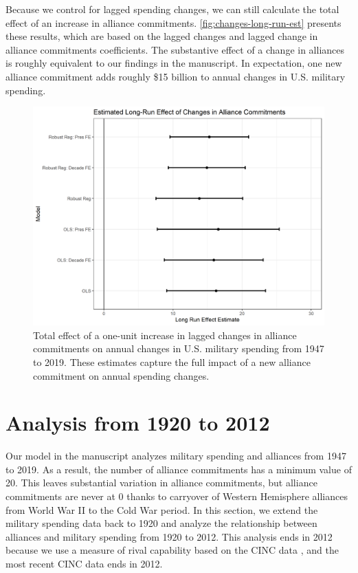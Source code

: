 \documentclass[12pt]{article}
\begin{document}
Because we control for lagged spending changes, we can still calculate the total effect of an increase in alliance commitments. 
\autoref{fig:changes-long-run-est} presents these results, which are based on the lagged changes and lagged change in alliance commitments coefficients.
The substantive effect of a change in alliances is roughly equivalent to our findings in the manuscript. 
In expectation, one new alliance commitment adds roughly \$15 billion to annual changes in U.S. military spending. 


\begin{figure} 
\includegraphics[width = .95\textwidth]{changes-long-run-est.png}
\caption{Total effect of a one-unit increase in lagged changes in alliance commitments on annual changes in U.S. military spending from 1947 to 2019.
These estimates capture the full impact of a new alliance commitment on annual spending changes.}
\label{fig:changes-long-run-est}
\end{figure}



\section{Analysis from 1920 to 2012}


Our model in the manuscript analyzes military spending and alliances from 1947 to 2019. 
As a result, the number of alliance commitments has a minimum value of 20. 
This leaves substantial variation in alliance commitments, but alliance commitments are never at 0 thanks to carryover of Western Hemisphere alliances from World War II to the Cold War period. 
In this section, we extend the military spending data back to 1920 and analyze the relationship between alliances and military spending from 1920 to 2012.
This analysis ends in 2012 because we use a measure of rival capability based on the CINC data \citep{SingerCINC1988}, and the most recent CINC data ends in 2012.
\end{document}
